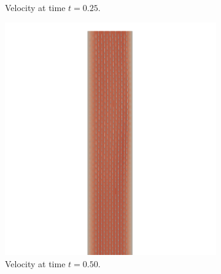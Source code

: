 \documentclass[a4paper,11pt,oneside]{book}
\begin{document}
\begin{figure}[h!]
\begin{subfigure}[b]{0.5\linewidth}
        \centering 
    \caption{Velocity at time $t = 0.25$.} 
    \label{fig2:b} 
    \vspace{4ex}
  \end{subfigure} 
  \begin{subfigure}[b]{0.5\linewidth}
    \centering
    \includegraphics[width=1.2\linewidth]{images/velocity_30_050.png} 
        \centering
    \caption{Velocity at time $t = 0.50$.} 
    \label{fig2:c} 
  \end{subfigure}%
  \begin{subfigure}[b]{0.5\linewidth}
    \centering

\end{subfigure}
\end{figure}
\end{document}
